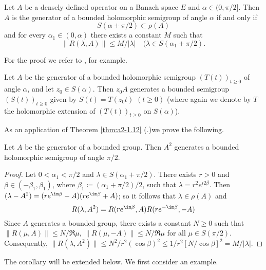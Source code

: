 \begin{theorem}\label{thm:a2-1.12}
Let $A$ be a densely defined operator on a Banach space $E$ and $\alpha \in (0,\pi/2]$.
Then $A$ is the generator of a bounded holomorphic semigroup of angle $\alpha$ if and only if 
\[
S(\alpha + \pi/2) \subset \rho(A)
\]
and for every $\alpha_{1} \in (0,\alpha)$ there exists a constant $M$ such that
\begin{equation}\label{eq:a2-1.6}
    \|R(\lambda,A)\| \leq M/|\lambda| \quad (\lambda \in S(\alpha_{1} + \pi/2) .
\end{equation}
\end{theorem}
For the proof we refer to \citet{davies:1980}, for example.

\begin{remark*}\label{rem:a2-1.6-kgk}
Let $A$ be the generator of a bounded holomorphic semigroup $(T(t))_{t \geq 0}$ 
of angle $\alpha$, and let $z_{0} \in S(\alpha)$.
Then $z_{0}A$ generates a bounded semigroup 
$(S(t))_{t \geq 0}$ given by $S(t) = T(z_{0}t)$  $(t \geq 0)$ (where again we denote by $T$ the holomorphic extension of $(T(t))_{t \geq 0}$ on $S(\alpha)$).
\end{remark*}
As an application of Theorem \ref{thm:a2-1.12} (.)we prove the following.
\begin{corollary}\label{cor:a2-1.13}
Let $A$ be the generator of a bounded group.
Then $A^{2}$ generates a bounded holomorphic semigroup of angle $\pi/2$.
\end{corollary}
\begin{proof}
Let $0 < \alpha_{1} < \pi/2$ and $\lambda \in S(\alpha_{1} + \pi/2)$.
There exists $r > 0$ and $\beta \in (-\beta_{1},\beta_{1})$,
where $\beta_{1} \coloneqq (\alpha_{1} + \pi/2)/2$,
such that $\lambda = r^{2}e^{i2\beta}$.
Then $(\lambda - A^{2}) = (re^{\im\beta} - A)(re^{\im\beta} + A) $; 
so it follows that $\lambda \in \rho(A)$ and 
\begin{equation}\label{eq:a2-1.7}
    R(\lambda,A^{2}) = R(re^{\im\beta},A)R(re^{-\im\beta},-A)
\end{equation}
Since $A$ generates a bounded group, there exists a constant $N \geq 0$ such that 
$\|R(\mu,A)\| \leq N/\Re\mu$, $\|R(\mu,-A)\| \leq N/\Re\mu$ for all $\mu \in S(\pi/2)$.
Consequently, $\|R(\lambda,A^{2})\| \leq N^{2}/r^{2}(\cos\beta)^{2} \leq 1/r^{2}[N/\cos\beta]^{2} = M/|\lambda|$.
\end{proof}
The corollary will be extended below.
We first consider an example.
